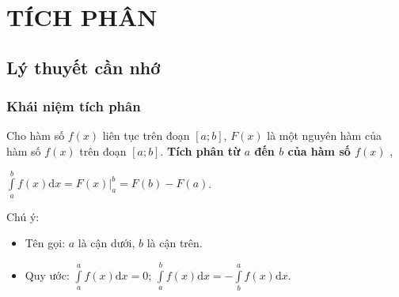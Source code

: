 \newpage \setcounter{section}{1}
\def\tenchude{TÍCH PHÂN}
\section{TÍCH PHÂN}
\subsection{Lý thuyết cần nhớ}
\subsubsection{Khái niệm tích phân}
Cho hàm số $f(x)$ liên tục trên đoạn $\left[a;b\right]$, $F(x)$ là một nguyên hàm của hàm số $f(x)$ trên đoạn $\left[a;b\right]$. 
\textbf{\boldmath Tích phân từ $a$ đến $b$ của hàm số $f(x)$ \unboldmath},
\begin{center}
	$\displaystyle\int\limits_a^bf(x)\mathrm{d}x= F(x)\big|_a^b=F(b)-F(a)$.
\end{center}
\begin{note}Chú ý:
	\begin{itemize}
		\item Tên gọi: $a$ là cận dưới, $b$ là cận trên.
		\item Quy ước: $\int\limits_a^af(x)\mathrm{d}x=0$; $\int\limits_a^bf(x)\mathrm{d}x=-\int\limits_b^af(x)\mathrm{d}x$.
	\end{itemize}
\end{note}
